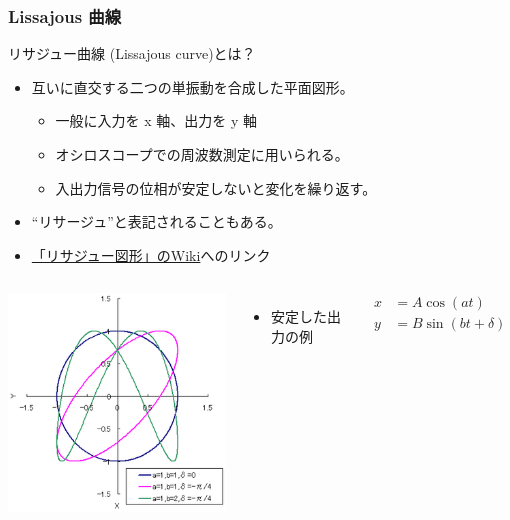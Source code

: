 \documentclass[12pt, dvipdfmx]{beamer}
\begin{document}
\begin{frame}
	\frametitle{Lissajous 曲線}
		\begin{block}{リサジュー曲線 (Lissajous curve)とは？}
			\begin{itemize}
				\item 互いに直交する二つの単振動を合成した平面図形。
				\begin{itemize}
					\item 一般に入力を x 軸、出力を y 軸
					\item オシロスコープでの周波数測定に用いられる。
					\item 入出力信号の位相が安定しないと変化を繰り返す。
				\end{itemize}
				\item “リサージュ”と表記されることもある。
				\item \textcolor{red}{\href{https://ja.wikipedia.org/wiki/リサジュー図形}{「リサジュー図形」のWiki}}へのリンク
			\end{itemize}
		\end{block}

	\begin{columns}[c, onlytextwidth]
				\centering
					\includegraphics[width=\textwidth]{Lissajou.png}	
			\begin{itemize}
				\item 安定した出力の例
			\end{itemize}
			\vspace{-5mm}
			\begin{align*}
				x&=A \cos(at) \\
				y&=B \sin(bt + \delta)
			\end{align*}
	\end{columns}
\end{frame}
\end{document}
